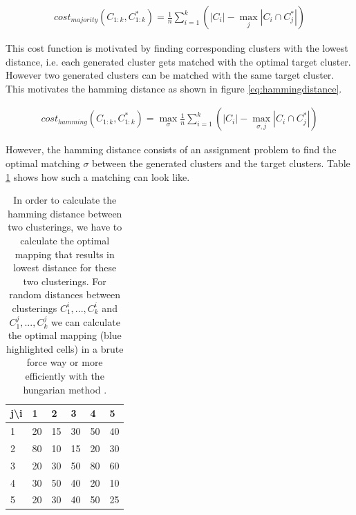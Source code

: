 \begin{equation}
    \begin{aligned}
        cost_{majority}(C_{1:k}, C_{1:k}^*) = \frac{1}{n} \sum\limits_{i=1}^{k} (|C_i| - \max\limits_j |C_i \cap C_j^*|)
    \end{aligned}
    \label{eq:majoritydistance}
\end{equation}

This cost function is motivated by finding corresponding clusters with the lowest distance, i.e. each generated cluster gets matched with the optimal target cluster. However two generated clusters can be matched with the same target cluster. This motivates the hamming distance as shown in figure \ref{eq:hammingdistance}.

\begin{equation}
    \begin{aligned}
        cost_{hamming}(C_{1:k}, C_{1:k}^*) = \max\limits_{\sigma} \frac{1}{n} \sum\limits_{i=1}^{k} (|C_i| - \max\limits_{\sigma, j} |C_i \cap C_j^*|)
    \end{aligned}
    \label{eq:hammingdistance}
\end{equation}

However, the hamming distance consists of an assignment problem to find the optimal matching $\sigma$ between the generated clusters and the target clusters. Table \ref{table:matching} shows how such a matching can look like.

\begin{table}[h]
    \centering
    \begin{tabular}{|l | l l l l l|}
    \hline
    j\textbackslash i & 1 & 2 & 3 & 4 & 5\\ \hline
    1 & 20 & \cellcolor{blue!25}15 & 30 & 50 & 40\\
    2 & 80 & 10 & \cellcolor{blue!25}15 & 20 & 30\\
    3 & \cellcolor{blue!25}20 & 30 & 50 & 80 & 60\\
    4 & 30 & 50 & 40 & \cellcolor{blue!25}20 & 10\\
    5 & 20 & 30 & 40 & 50 & \cellcolor{blue!25}25\\ \hline
    \end{tabular}
    \caption{In order to calculate the hamming distance between two clusterings, we have to calculate the optimal mapping that results in lowest distance for these two clusterings. For random distances between clusterings $C_1^i, ..., C_k^i$ and $C_1^j, ..., C_k^j$ we can calculate the optimal mapping (blue highlighted cells) in a brute force way or more efficiently with the hungarian method \cite{kuhn1955hungarian}\cite{munkres1957algorithms}.}
    \label{table:matching}
\end{table}

